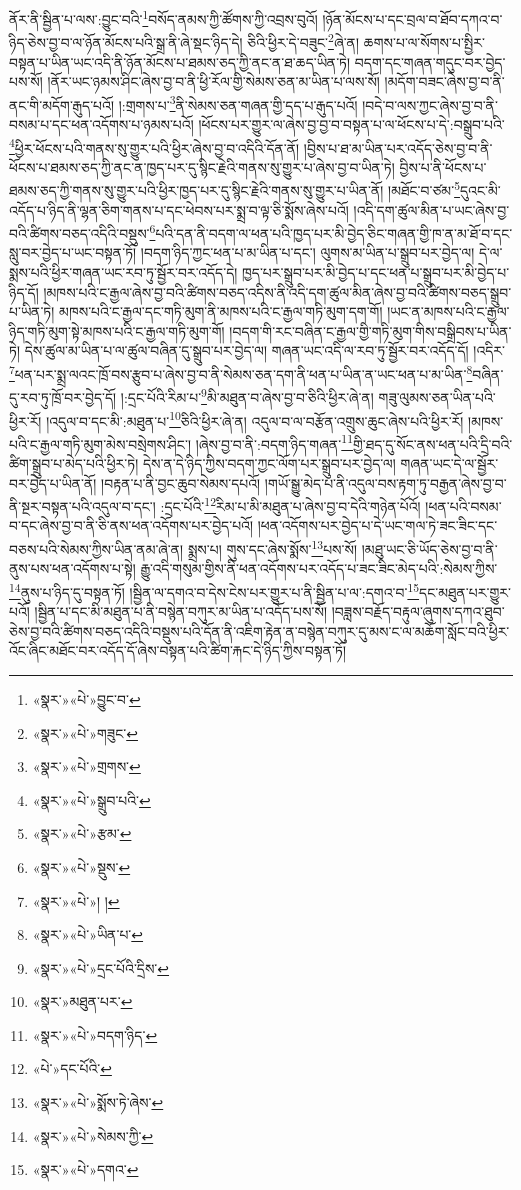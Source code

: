 ནོར་ནི་སྦྱིན་པ་ལས་:བྱུང་བའི་\footnote{«སྣར་»«པེ་»བྱུང་བ་}བསོད་ནམས་ཀྱི་ཚོགས་ཀྱི་འབྲས་བུའོ། །ཉོན་མོངས་པ་དང་བྲལ་བ་ཐོབ་དཀའ་བ་ཉིད་ཅེས་བྱ་བ་ལ་ཉོན་མོངས་པའི་སྒྲ་ནི་ཞེ་སྡང་ཉིད་དེ། ཅིའི་ཕྱིར་དེ་བཟུང་\footnote{«སྣར་»«པེ་»གཟུང་}ཞེ་ན། ཆགས་པ་ལ་སོགས་པ་སྤྱིར་བསྟན་པ་ཡིན་ཡང་འདི་ནི་ཉོན་མོངས་པ་ཐམས་ཅད་ཀྱི་ནང་ན་ཐ་ཆད་ཡིན་ཏེ། བདག་དང་གཞན་གདུང་བར་བྱེད་པས་སོ། །ནོར་ཡང་ཉམས་ཤིང་ཞེས་བྱ་བ་ནི་ཕྱི་རོལ་གྱི་སེམས་ཅན་མ་ཡིན་པ་ལས་སོ། །མདོག་བཟང་ཞེས་བྱ་བ་ནི་ནང་གི་མདོག་རྒུད་པའོ། །:གྲགས་པ་\footnote{«སྣར་»«པེ་»གྲགས་}ནི་སེམས་ཅན་གཞན་གྱི་དད་པ་རྒུད་པའོ། །བདེ་བ་ལས་ཀྱང་ཞེས་བྱ་བ་ནི་བསམ་པ་དང་ཕན་འདོགས་པ་ཉམས་པའོ། །ཕོངས་པར་གྱུར་ལ་ཞེས་བྱ་བྱ་བ་བསྟན་པ་ལ་ཕོངས་པ་དེ་:བསྒྲུབ་པའི་\footnote{«སྣར་»«པེ་»སྒྲུབ་པའི་}ཕྱིར་ཕོངས་པའི་གནས་སུ་གྱུར་པའི་ཕྱིར་ཞེས་བྱ་བ་འདིའི་དོན་ནོ། །བྱིས་པ་ཐ་མ་ཡིན་པར་འདོད་ཅེས་བྱ་བ་ནི་ཕོངས་པ་ཐམས་ཅད་ཀྱི་ནང་ན་ཁྱད་པར་དུ་སྙིང་རྗེའི་གནས་སུ་གྱུར་པ་ཞེས་བྱ་བ་ཡིན་ཏེ། བྱིས་པ་ནི་ཕོངས་པ་ཐམས་ཅད་ཀྱི་གནས་སུ་གྱུར་པའི་ཕྱིར་ཁྱད་པར་དུ་སྙིང་རྗེའི་གནས་སུ་གྱུར་པ་ཡིན་ནོ། །མཐོང་བ་ཙམ་\footnote{«སྣར་»«པེ་»རྩམ་}དུའང་མི་འདོད་པ་ཉིད་ནི་ལྷན་ཅིག་གནས་པ་དང་ཕེབས་པར་སྨྲ་བ་ལྟ་ཅི་སྨོས་ཞེས་པའོ། །འདི་དག་ཚུལ་མིན་པ་ཡང་ཞེས་བྱ་བའི་ཚིགས་བཅད་འདིའི་བསྡུས་\footnote{«སྣར་»«པེ་»སྡུས་}པའི་དན་ནི་བདག་ལ་ཕན་པའི་ཁྱད་པར་མི་བྱེད་ཅིང་གཞན་གྱི་ཁ་ན་མ་ཐོ་བ་དང་སླུ་བར་བྱེད་པ་ཡང་བསྟན་ཏོ། །བདག་ཉིད་ཀྱང་ཕན་པ་མ་ཡིན་པ་དང་། ལུགས་མ་ཡིན་པ་སྒྲུབ་པར་བྱེད་ལ། དེ་ལ་སྨས་པའི་ཕྱིར་གཞན་ཡང་རབ་ཏུ་སྦྱོར་བར་འདོད་དེ། ཁྱད་པར་སྒྲུབ་པར་མི་བྱེད་པ་དང་ཕན་པ་སྒྲུབ་པར་མི་བྱེད་པ་ཉིད་དོ། །མཁས་པའི་ང་རྒྱལ་ཞེས་བྱ་བའི་ཚིགས་བཅད་འདིས་ནི་འདི་དག་ཚུལ་མིན་ཞེས་བྱ་བའི་ཚིགས་བཅད་སྒྲུབ་པ་ཡིན་ཏེ། མཁས་པའི་ང་རྒྱལ་དང་གཏི་མུག་ནི་མཁས་པའི་ང་རྒྱལ་གཏི་མུག་དག་གོ། །ཡང་ན་མཁས་པའི་ང་རྒྱལ་ཉིད་གཏི་མུག་སྟེ་མཁས་པའི་ང་རྒྱལ་གཏི་མུག་གོ། །བདག་གི་རང་བཞིན་ང་རྒྱལ་གྱི་གཏི་མུག་གིས་བསྒྲིབས་པ་ཡིན་ཏེ། དེས་ཚུལ་མ་ཡིན་པ་ལ་ཚུལ་བཞིན་དུ་སྒྲུབ་པར་བྱེད་ལ། གཞན་ཡང་འདི་ལ་རབ་ཏུ་སྦྱོར་བར་འདོད་དོ། །འདིར་\footnote{«སྣར་»«པེ་»། །}ཕན་པར་སྨྲ་ལའང་ཁྲོ་བས་རྩུབ་པ་ཞེས་བྱ་བ་ནི་སེམས་ཅན་དག་ནི་ཕན་པ་ཡིན་ན་ཡང་ཕན་པ་མ་ཡིན་\footnote{«སྣར་»«པེ་»ཡིན་པ་}བཞིན་དུ་རབ་ཏུ་ཁྲོ་བར་བྱེད་དོ། །:དྲང་པོའི་རིམ་པ་\footnote{«སྣར་»«པེ་»དྲང་པོའི་དྲིས་}མི་མཐུན་བ་ཞེས་བྱ་བ་ཅིའི་ཕྱིར་ཞེ་ན། གཟུ་ལུམས་ཅན་ཡིན་པའི་ཕྱིར་རོ། །འདུལ་བ་དང་མི་:མཐུན་པ་\footnote{«སྣར་»མཐུན་པར་}ཅིའི་ཕྱིར་ཞེ་ན། འདུལ་བ་ལ་བརྩོན་འགྲུས་ཆུང་ཞེས་པའི་ཕྱིར་རོ། །མཁས་པའི་ང་རྒྱལ་གཏི་མུག་མེས་བསྲེགས་ཤིང་། །ཞེས་བྱ་བ་ནི་:བདག་ཉིད་གཞན་\footnote{«སྣར་»«པེ་»བདག་ཉིད་}གྱི་ཐད་དུ་སོང་ནས་ཕན་པའི་དྲི་བའི་ཚིག་སྒྲུབ་པ་མེད་པའི་ཕྱིར་ཏེ། དེས་ན་དེ་ཉིད་ཀྱིས་བདག་ཀྱང་ལོག་པར་སྒྲུབ་པར་བྱེད་ལ། གཞན་ཡང་དེ་ལ་སྦྱོར་བར་བྱེད་པ་ཡིན་ནོ། །བརྟན་པ་ནི་བྱང་ཆུབ་སེམས་དཔའོ། །གཡོ་སྒྱུ་མེད་པ་ནི་འདུལ་བས་རྟག་ཏུ་བརྒྱན་ཞེས་བྱ་བ་ནི་སྔར་བསྟན་པའི་འདུལ་བ་དང་། :དྲང་པོའི་\footnote{«པེ་»དང་པོའི་}རིམ་པ་མི་མཐུན་པ་ཞེས་བྱ་བ་དེའི་གཉེན་པོའོ། །ཕན་པའི་བསམ་བ་དང་ཞེས་བྱ་བ་ནི་ཅི་ནས་ཕན་འདོགས་པར་བྱེད་པའོ། །ཕན་འདོགས་པར་བྱེད་པ་དེ་ཡང་གལ་ཏེ་ཟང་ཟིང་དང་བཅས་པའི་སེམས་ཀྱིས་ཡིན་ནམ་ཞེ་ན། སྨྲས་པ། གུས་དང་ཞེས་སྨོས་\footnote{«སྣར་»«པེ་»སྨོས་ཏེ་ཞེས་}པས་སོ། །མཐུ་ཡང་ཅི་ཡོད་ཅེས་བྱ་བ་ནི་ནུས་པས་ཕན་འདོགས་པ་སྟེ། རྒྱུ་འདི་གསུམ་གྱིས་ནི་ཕན་འདོགས་པར་འདོད་པ་ཟང་ཟིང་མེད་པའི་:སེམས་ཀྱིས་\footnote{«སྣར་»«པེ་»སེམས་ཀྱི་}ནུས་པ་ཉིད་དུ་བསྟན་ཏོ། །སྦྱིན་ལ་དགའ་བ་དེས་ངེས་པར་གྱུར་པ་ནི་སྦྱིན་པ་ལ་:དགའ་བ་\footnote{«སྣར་»«པེ་»དགའ་}དང་མཐུན་པར་གྱུར་པའོ། །སྦྱིན་པ་དང་མི་མཐུན་པ་ནི་བསྙེན་བཀུར་མ་ཡིན་པ་འདོད་པས་སོ། །བཟླས་བརྗོད་བརྟུལ་ཞུགས་དཀའ་ཐུབ་ཅེས་བྱ་བའི་ཚིགས་བཅད་འདིའི་བསྡུས་པའི་དོན་ནི་འཇིག་རྟེན་ན་བསྙེན་བཀུར་དུ་མས་ང་ལ་མཆོག་སློང་བའི་ཕྱིར་འོང་ཞིང་མཐོང་བར་འདོད་དོ་ཞེས་བསྟན་པའི་ཚིག་རྐང་དེ་ཉིད་ཀྱིས་བསྟན་ཏོ། 